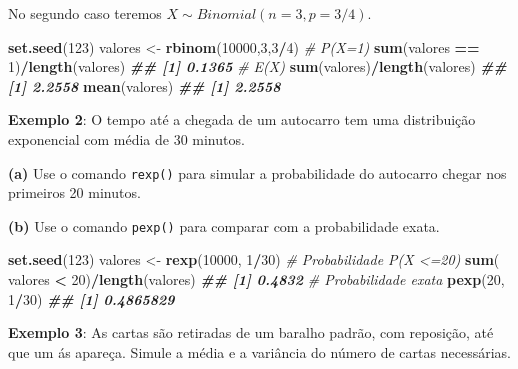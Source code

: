 \documentclass[
]{book}
\newenvironment{Shaded}{\begin{snugshade}}{\end{snugshade}}
\newcommand{\CommentTok}[1]{\textcolor[rgb]{0.56,0.35,0.01}{\textit{#1}}}
\newcommand{\DecValTok}[1]{\textcolor[rgb]{0.00,0.00,0.81}{#1}}
\newcommand{\DocumentationTok}[1]{\textcolor[rgb]{0.56,0.35,0.01}{\textbf{\textit{#1}}}}
\newcommand{\FunctionTok}[1]{\textcolor[rgb]{0.13,0.29,0.53}{\textbf{#1}}}
\newcommand{\NormalTok}[1]{#1}
\newcommand{\OtherTok}[1]{\textcolor[rgb]{0.56,0.35,0.01}{#1}}
\newcommand{\SpecialCharTok}[1]{\textcolor[rgb]{0.81,0.36,0.00}{\textbf{#1}}}
\begin{document}
No segundo caso teremos \(X \sim Binomial(n=3,p=3/4)\).

\begin{Shaded}
\begin{Highlighting}[]
\FunctionTok{set.seed}\NormalTok{(}\DecValTok{123}\NormalTok{)}
\NormalTok{valores }\OtherTok{\textless{}{-}} \FunctionTok{rbinom}\NormalTok{(}\DecValTok{10000}\NormalTok{,}\DecValTok{3}\NormalTok{,}\DecValTok{3}\SpecialCharTok{/}\DecValTok{4}\NormalTok{)}
\CommentTok{\# P(X=1)}
\FunctionTok{sum}\NormalTok{(valores }\SpecialCharTok{==} \DecValTok{1}\NormalTok{)}\SpecialCharTok{/}\FunctionTok{length}\NormalTok{(valores)}
\DocumentationTok{\#\# [1] 0.1365}
\CommentTok{\# E(X)}
\FunctionTok{sum}\NormalTok{(valores)}\SpecialCharTok{/}\FunctionTok{length}\NormalTok{(valores)}
\DocumentationTok{\#\# [1] 2.2558}
\FunctionTok{mean}\NormalTok{(valores)}
\DocumentationTok{\#\# [1] 2.2558}
\end{Highlighting}
\end{Shaded}

\textbf{Exemplo 2}: O tempo até a chegada de um autocarro tem uma
distribuição exponencial com média de 30 minutos.

\textbf{(a)} Use o comando \texttt{rexp()} para simular a probabilidade do autocarro
chegar nos primeiros 20 minutos.

\textbf{(b)} Use o comando \texttt{pexp()} para comparar com a probabilidade exata.

\begin{Shaded}
\begin{Highlighting}[]
\FunctionTok{set.seed}\NormalTok{(}\DecValTok{123}\NormalTok{)}
\NormalTok{valores }\OtherTok{\textless{}{-}} \FunctionTok{rexp}\NormalTok{(}\DecValTok{10000}\NormalTok{, }\DecValTok{1}\SpecialCharTok{/}\DecValTok{30}\NormalTok{)}
\CommentTok{\# Probabilidade P(X \textless{}=20)}
\FunctionTok{sum}\NormalTok{( valores }\SpecialCharTok{\textless{}} \DecValTok{20}\NormalTok{)}\SpecialCharTok{/}\FunctionTok{length}\NormalTok{(valores)}
\DocumentationTok{\#\# [1] 0.4832}
\CommentTok{\# Probabilidade exata}
\FunctionTok{pexp}\NormalTok{(}\DecValTok{20}\NormalTok{, }\DecValTok{1}\SpecialCharTok{/}\DecValTok{30}\NormalTok{)}
\DocumentationTok{\#\# [1] 0.4865829}
\end{Highlighting}
\end{Shaded}

\textbf{Exemplo 3}: As cartas são retiradas de um baralho padrão, com
reposição, até que um ás apareça. Simule a média e a variância do número
de cartas necessárias.
\end{document}
